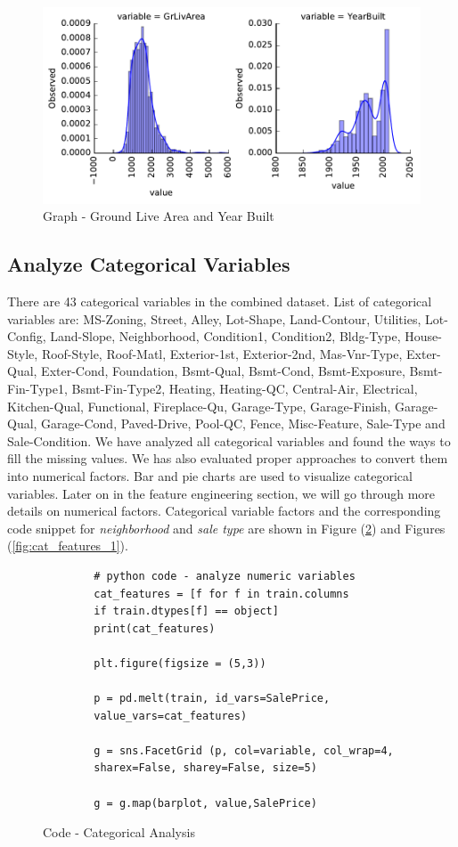 \documentclass[sigconf]{acmart}
\begin{document}
	\begin{figure}[htb]
		\centering
		\includegraphics[width=1.0\columnwidth]{images/num_features_2}	
		\caption{Graph - Ground Live Area and Year Built} \label{fig:num_features_2} 
	\end{figure}
	
	\subsection{Analyze Categorical Variables}
	There are 43 categorical variables in the combined dataset. List of categorical variables are: MS-Zoning, Street, Alley, Lot-Shape, Land-Contour, Utilities, Lot-Config, Land-Slope, Neighborhood, Condition1, Condition2, Bldg-Type, House-Style, Roof-Style, Roof-Matl, Exterior-1st, Exterior-2nd, Mas-Vnr-Type, Exter-Qual, Exter-Cond, Foundation, Bsmt-Qual, Bsmt-Cond, Bsmt-Exposure, Bsmt-Fin-Type1, Bsmt-Fin-Type2, Heating, Heating-QC, Central-Air, Electrical, Kitchen-Qual, Functional, Fireplace-Qu, Garage-Type, Garage-Finish, Garage-Qual, Garage-Cond, Paved-Drive, Pool-QC, Fence, Misc-Feature, Sale-Type and Sale-Condition. We have analyzed all categorical variables and found the ways to fill the missing values. We has also evaluated proper approaches to convert them into numerical factors. Bar and pie charts are used to visualize categorical variables. Later on in the feature engineering section, we will go through more details on numerical factors. Categorical variable factors and the corresponding code snippet for {\em neighborhood} and {\em sale type} are shown in Figure (\ref{c:analyze-cat}) and Figures (\ref{fig:cat_features_1}).
	
	\begin{figure}[htb]
		\begin{verbatim}	
		# python code - analyze numeric variables
		cat_features = [f for f in train.columns 
		if train.dtypes[f] == object]
		print(cat_features)
		
		plt.figure(figsize = (5,3))
		
		p = pd.melt(train, id_vars=SalePrice,
		value_vars=cat_features)
		
		g = sns.FacetGrid (p, col=variable, col_wrap=4, 
		sharex=False, sharey=False, size=5)
		
		g = g.map(barplot, value,SalePrice)				
		\end{verbatim}
		\caption{Code - Categorical Analysis} \label{c:analyze-cat} 
	\end{figure}
	
\end{document}
